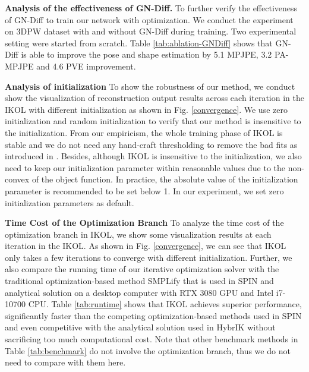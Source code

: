 \documentclass[letterpaper]{article} \usepackage{aaai23}  \usepackage{times}  \usepackage{helvet}  \usepackage{courier}  \usepackage[hyphens]{url}  \usepackage{graphicx} \urlstyle{rm} \def\UrlFont{\rm}  \usepackage{natbib}  \usepackage{caption} \frenchspacing  \setlength{\pdfpagewidth}{8.5in}  \setlength{\pdfpageheight}{11in}  \usepackage{algorithm}
\begin{document}
\noindent\textbf{Analysis of the effectiveness of GN-Diff.}
To further verify the effectiveness of GN-Diff to train our network with optimization. We conduct the experiment on 3DPW dataset with and without GN-Diff during training. Two experimental setting were started from scratch. Table \ref{tab:ablation-GNDiff} shows that GN-Diff is able to improve the pose and shape estimation by 5.1 MPJPE, 3.2 PA-MPJPE and 4.6 PVE improvement.






\noindent\textbf{Analysis of initialization}
To show the robustness of our method, we conduct show the visualization of reconstruction output results across each iteration  in the IKOL with different initialization as shown in Fig. \ref{convergence}. We use zero initialization and random initialization to verify that our method is insensitive to the initialization. From our empiricism, the whole training phase of IKOL is stable and we do not need any hand-craft thresholding to remove the bad fits as introduced in \cite{kolotouros2019learning}. Besides, although IKOL is insensitive to the initialization, we also need to keep our initialization parameter within reasonable values due to the non-convex of the object function. In practice, the absolute value of the initialization parameter is recommended to be set below 1. In our experiment, we set zero initialization parameters as default. 




\noindent\textbf{Time Cost of the Optimization Branch}
To analyze the time cost of the optimization branch in IKOL, we show some visualization results at each iteration  in the IKOL. As shown in Fig. \ref{convergence}, we can see that IKOL only takes a few iterations to converge with different initialization. Further, we also compare the running time of our iterative optimization solver with the traditional optimization-based method SMPLify \cite{bogo2016keep} that is used in SPIN and analytical solution on a desktop computer with RTX 3080 GPU and Intel i7-10700 CPU. Table \ref{tab:runtime} shows that IKOL achieves superior performance, significantly faster than the competing optimization-based methods used in SPIN and even competitive with the analytical solution used in HybrIK without sacrificing too much computational cost. Note that other benchmark methods in Table \ref{tab:benchmark} do not involve the optimization branch, thus we do not need to compare with them here. 
\end{document}

